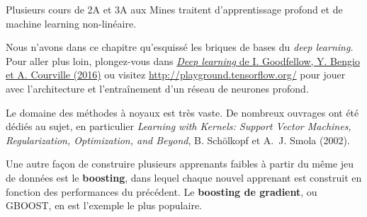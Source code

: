 \begin{plusloin}
\item Plusieurs cours de 2A et 3A aux Mines traitent d'apprentissage profond et
  de machine learning non-linéaire.
\item Nous n'avons dans ce chapitre qu'esquissé les briques de bases du
  \textit{deep learning.} Pour aller plus loin, plongez-vous dans
  \href{http://www.deeplearningbook.org}{\textit{Deep learning} de
    I. Goodfellow, Y. Bengio et A. Courville (2016)} ou visitez
    \href{http://playground.tensorflow.org/}{http://playground.tensorflow.org/}
    pour jouer avec
  l'architecture et l'entraînement d'un réseau de neurones profond.
\item Le domaine des méthodes à noyaux est très vaste. De nombreux ouvrages ont
  été dédiés au sujet, en particulier \textit{Learning with Kernels: Support
    Vector Machines, Regularization, Optimization, and Beyond}, B. Schölkopf et
  A.~J. Smola (2002).
\item Une autre façon de construire plusieurs apprenants faibles à partir du
  même jeu de données est le \textbf{boosting}, 
  dans lequel chaque nouvel apprenant est construit en fonction des
  performances du précédent. Le \textbf{boosting de gradient}, ou GBOOST, en est
  l'exemple le plus populaire.
\end{plusloin}






